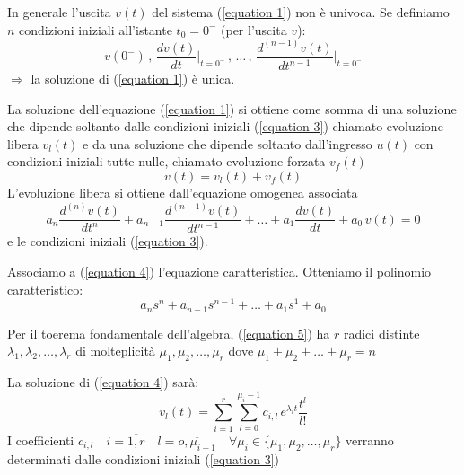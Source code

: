 \begin{osservazione}
	In generale l'uscita $v(t)$ del sistema (\ref{equation 1})
	non è univoca. Se definiamo $n$ condizioni iniziali all'istante $t_0 = 0^-$ (per l'uscita $v$):
	\begin{equation}
		v(0^-) \,
		,\, \frac{dv(t)}{dt}\bigg\vert_{t=0^-} \,
		,\, \dots\,
		,\, \frac{d^{(n-1)}v(t)}{dt^{n-1}}\bigg\vert_{t=0^-}
		\tag{3}\label{equation 3}
	\end{equation}
	$\Rightarrow$ la soluzione di (\ref{equation 1}) è unica.
\end{osservazione}

La soluzione dell'equazione (\ref{equation 1}) si ottiene come somma di una soluzione che dipende soltanto dalle condizioni iniziali (\ref{equation 3}) chiamato evoluzione libera $v_l(t)$ e da una soluzione che dipende soltanto dall'ingresso $u(t)$ con condizioni iniziali tutte nulle, chiamato evoluzione forzata $v_f(t)$ %
\[
v(t) = v_l(t) + v_f(t)
\]
L'evoluzione libera si ottiene dall'equazione omogenea associata
\begin{equation}
	a_n \frac{d^{(n)} v(t)}{dt^n} 
		+ a_{n-1} \frac{d^{(n-1)} v(t)}{dt^{n-1}} 
		+ \dots 
		+ a_1 \frac{dv(t)}{dt} 
		+ a_0\,v(t)
	= 0
	\tag{4}\label{equation 4}
\end{equation}
e le condizioni iniziali (\ref{equation 3}).

Associamo a (\ref{equation 4}) l'equazione caratteristica. Otteniamo il polinomio caratteristico: %
\begin{equation}
	a_n s^n 
	+ a_{n-1} s^{n-1}
	+ \dots
	+ a_1 s^1
	+ a_0
	\tag{5}\label{equation 5}
\end{equation}

Per il toerema fondamentale dell'algebra, (\ref{equation 5}) ha $r$ radici  distinte $\lambda_1,\lambda_2, \dots, \lambda_r$ di molteplicità $\mu_1, \mu_2, \dots,\mu_r$ dove  $\mu_1 +\mu_2 + \dots + \mu_r = n$

La soluzione di (\ref{equation 4}) sarà:
\begin{equation}
	v_l(t)=  \sum_{i=1}^{r}\sum_{l=0}^{\mu_i-1}c_{i,l} \,e^{\lambda_it}\frac{t^l}{l!}
	\tag{6}\label{equation 6}
\end{equation}
I coefficienti $c_{i,l}
	\quad i=\overline{1,r} 
	\quad l=\overline{o,\mu_{i-1}}
	\quad \forall\mu_i \in \{\mu_1,\mu_2,\dots,\mu_r\} $ 
	verranno determinati dalle condizioni iniziali (\ref{equation 3})
	
